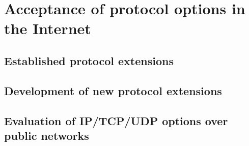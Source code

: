 \chapter{Acceptance of protocol options in the Internet}
\label{protoops:chapter}

\section{Established protocol extensions}
\label{protoops:established}

\section{Development of new protocol extensions}
\label{protoops:develop}

\section{Evaluation of IP/TCP/UDP options over public networks}
\label{protoops:evaluation}


